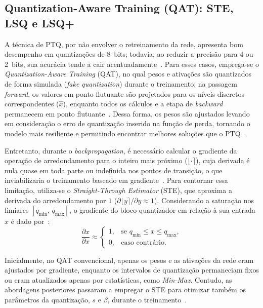 \subsection{Quantization-Aware Training (QAT): STE, LSQ e LSQ+}

A técnica de PTQ, por não envolver o retreinamento da rede, apresenta bom desempenho em quantizações de 8~bits; todavia, ao reduzir a precisão para 4 ou 2~bits, sua acurácia tende a
cair acentuadamente~\cite{bhalgat2020,nagel2021}. Para esses casos, emprega-se o \textit{Quantization-Aware Training} (QAT), no qual pesos e ativações são quantizados de forma      
simulada (\textit{fake quantization}) durante o treinamento: na passagem \textit{forward}, os valores em ponto flutuante são projetados para os níveis discretos correspondentes       
($\hat{x}$), enquanto todos os cálculos e a etapa de \textit{backward} permanecem em ponto flutuante~\cite{nagel2021,pereira2023}. Dessa forma, os pesos são ajustados levando em 
consideração o erro de quantização inserido na função de perda, tornando o modelo mais resiliente e permitindo encontrar melhores soluções que o PTQ~\cite{nagel2021,pereira2023}.

Entretanto, durante o \textit{backpropagation}, é necessário calcular o gradiente da operação de arredondamento para o inteiro mais próximo ($\lfloor \cdot \rceil$), cuja derivada é  
nula quase em toda parte ou indefinida nos pontos de transição, o que inviabilizaria o treinamento baseado em gradiente~\cite{lin2023,nagel2021}. Para contornar essa limitação,
utiliza-se o \textit{Straight-Through Estimator} (STE), que aproxima a derivada do arredondamento por $1$ ($\partial \lfloor y \rceil / \partial y \approx 1$). Considerando a
saturação nos limiares $[q_{\min},\, q_{\max}]$, o gradiente do bloco quantizador em relação à sua entrada $x$ é dado por~\cite{nagel2021}:
\begin{equation} 
\frac{\partial \hat{x}}{\partial x} \approx
\begin{cases} 
1, & \text{se } q_{\min} \le x \le q_{\max}, \\ 
0, & \text{caso contrário.}
\end{cases}
\label{eq:ste} 
\end{equation}

Inicialmente, no QAT convencional, apenas os pesos e as ativações da rede eram ajustados por gradiente, enquanto os intervalos de quantização permaneciam fixos ou eram atualizados apenas por       
estatísticas, como \textit{Min-Max}. Contudo, as abordagens posteriores passaram a empregar o STE para otimizar também os parâmetros da quantização, $s$ e $\beta$, durante o           
treinamento~\cite{bhalgat2020,nagel2021}.

